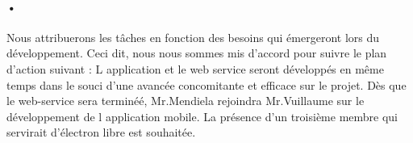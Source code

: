\documentclass[pdftex,12pt,a4paper]{article}
\begin{document}
\paragraph{•}
Nous attribuerons les t\^aches en fonction des besoins qui \'emergeront lors du d\'eveloppement. Ceci dit, nous nous sommes mis d’accord pour suivre le plan d’action suivant : 
L application et le web service seront d\'evelopp\'es en m\^eme temps dans le souci d’une avanc\'ee concomitante et efficace sur le projet. D\`es que le web-service sera terminé\'e, Mr.Mendiela rejoindra Mr.Vuillaume sur le d\'eveloppement de l application mobile. La pr\'esence d’un troisi\`eme membre qui servirait d'\'electron libre est souhait\'ee.
\end{document}
